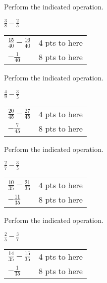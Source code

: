 {
	Perform the indicated operation.
	
	$\displaystyle \frac{3}{8}-\frac{2}{5}$
}
{
	\begin{tabular}{l r}
	$\frac{15}{40} -\frac{16}{40}$ & 4 pts to here\\
	$-\frac{1}{40}$ & 8 pts to here\\
	\end{tabular}
}

{
	Perform the indicated operation.
	
	$\displaystyle \frac{4}{9}-\frac{3}{5}$
}
{
	\begin{tabular}{l r}
	$\frac{20}{45} -\frac{27}{45}$ & 4 pts to here\\
	$-\frac{7}{45}$ & 8 pts to here\\
	\end{tabular}
}

{
	Perform the indicated operation.
	
	$\displaystyle \frac{2}{7}-\frac{3}{5}$
}
{
	\begin{tabular}{l r}
	$\frac{10}{35} -\frac{21}{35}$ & 4 pts to here\\
	$-\frac{11}{35}$ & 8 pts to here\\
	\end{tabular}
}

{
	Perform the indicated operation.
	
	$\displaystyle \frac{2}{5}-\frac{3}{7}$
}
{
	\begin{tabular}{l r}
	$\frac{14}{35} -\frac{15}{35}$ & 4 pts to here\\
	$-\frac{1}{35}$ & 8 pts to here\\
	\end{tabular}
}
